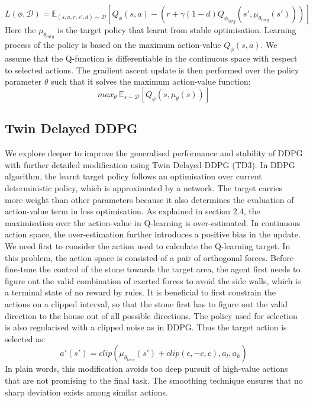 \documentclass[oneside,11pt,a4paper]{article}
\begin{document}
$$
L(\phi, \mathcal D) = \mathbb E_{(s,a,r,s',d)\sim \mathcal D}[Q_\phi(s,a) - (r+\gamma (1-d)Q_{\phi_{targ}}(s', \mu_{\theta_{targ}}(s')))]
$$
Here the $\mu_{\theta_{targ}}$ is the target policy that learnt from stable optimisation. Learning process of the policy is based on the maximum action-value $Q_\phi(s,a)$. We assume that the Q-function is differentiable in the continuous space with respect to selected actions. The gradient ascent update is then performed over the policy parameter $\theta$ such that it solves the maximum action-value function:
$$
max_\theta \  \mathbb E_{s\sim \mathcal D}[Q_\phi(s, \mu_\theta(s))]
$$
\newline
\newline
\noindent
\subsection{Twin Delayed DDPG}
We explore deeper to improve the generalised performance and stability of DDPG with further detailed modification using Twin Delayed DDPG (TD3).
\newline
\newline
\noindent
In DDPG algorithm, the learnt target policy follows an optimisation over current deterministic policy, which is approximated by a network. The target carries more weight than other parameters because it also determines the evaluation of action-value term in loss optimisation. As explained in section 2.4, the maximisation over the action-value in Q-learning is over-estimated. In continuous action space, the over-estimation further introduces a positive bias in the update.
\newline
\newline
\noindent
We need first to consider the action used to calculate the Q-learning target. In this problem, the action space is consisted of a pair of orthogonal forces. Before fine-tune the control of the stone towards the target area, the agent first needs to figure out the valid combination of exerted forces to avoid the side walls, which is a terminal state of no reward by rules. It is beneficial to first constrain the actions on a clipped interval, so that the stone first has to figure out the valid direction to the house out of all possible directions. The policy used for selection is also regularised with a clipped noise as in DDPG. Thus the target action is selected as:
$$
a'(s') = clip(\mu_{\theta_{targ}}(s') + clip(\epsilon,-c,c), a_l,a_h)
$$
In plain words, this modification avoids too deep pursuit of high-value actions that are not promising to the final task. The smoothing technique ensures that no sharp deviation exists among similar actions.
\end{document}
